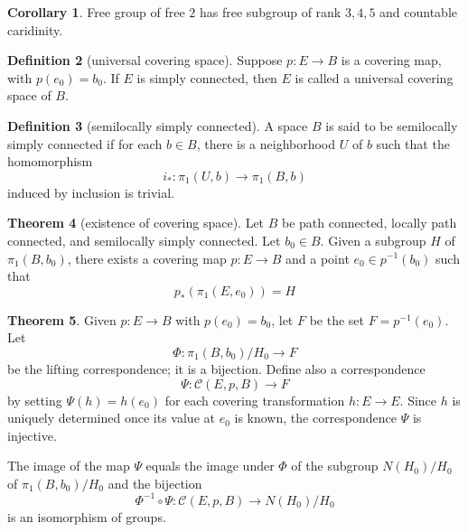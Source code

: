\documentclass[12pt,a4paper]{book}
\theoremstyle{definition}
\newtheorem{defn}{Definition}[section]
\newtheorem{coro}[defn]{Corollary}
\newtheorem{theo}[defn]{Theorem}
\begin{document}
\begin{coro}
    Free group of free $2$ has free subgroup of rank $3,4,5$ and countable caridinity.
\end{coro}
\begin{defn}[universal covering space]
    Suppose $p: E \rightarrow B$ is a covering map, with $p\left(e_0\right)=b_0$. If $E$ is simply connected, then $E$ is called a universal covering space of $B$.
\end{defn}
\begin{defn}[semilocally simply connected]
    A space $B$ is said to be semilocally simply connected if for each $b \in B$, there is a neighborhood $U$ of $b$ such that the homomorphism
    $$
        i_*: \pi_1(U, b) \rightarrow \pi_1(B, b)
    $$
    induced by inclusion is trivial.
\end{defn}
\begin{theo}[existence of covering space]
    Let $B$ be path connected, locally path connected, and semilocally simply connected. Let $b_0 \in B$.
    Given a subgroup $H$ of $\pi_1\left(B, b_0\right)$, there exists a covering map $p: E \rightarrow B$ and a point $e_0 \in p^{-1}\left(b_0\right)$ such that
    $$
        p_*\left(\pi_1\left(E, e_0\right)\right)=H
    $$
\end{theo}
\begin{theo}
    Given $p: E \rightarrow B$ with $p\left(e_0\right)=b_0$, let $F$ be the set $F=p^{-1}\left(e_0\right)$. Let
    $$
        \Phi: \pi_1\left(B, b_0\right) / H_0 \rightarrow F
    $$
    be the lifting correspondence; it is a bijection. Define also a correspondence
    $$
        \Psi: \mathcal{C}(E, p, B) \rightarrow F
    $$
    by setting $\Psi(h)=h\left(e_0\right)$ for each covering transformation $h: E \rightarrow E$. Since $h$ is uniquely determined once its value at $e_0$ is known, the correspondence $\Psi$ is injective.

    The image of the map $\Psi$ equals the image under $\Phi$ of the subgroup $N\left(H_0\right) / H_0$ of $\pi_1\left(B, b_0\right) / H_0$ and the bijection
    $$
        \Phi^{-1} \circ \Psi: \mathcal{C}(E, p, B) \rightarrow N\left(H_0\right) / H_0
    $$
    is an isomorphism of groups.
\end{theo}
\end{document}
